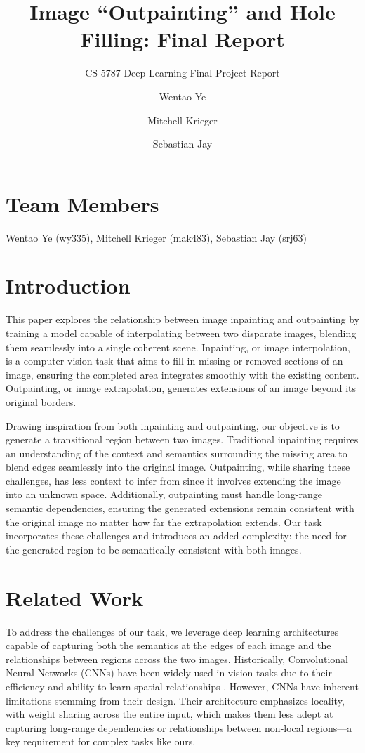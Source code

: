 \documentclass[sigconf]{acmart}
\title{Image “Outpainting” and Hole Filling: Final Report}
\subtitle{CS 5787 Deep Learning Final Project Report}
\author{Wentao Ye}
\affiliation{%
  \institution{Cornell University}
  \city{New York}
  \state{New York}
  \country{USA}
}
\author{Mitchell Krieger}
\affiliation{%
  \institution{Cornell University}
  \city{New York}
  \state{New York}
  \country{USA}
}
\author{Sebastian Jay}
\affiliation{%
  \institution{Cornell University}
  \city{New York}
  \state{New York}
  \country{USA}
}
\begin{document}
\maketitle

\section*{Team Members}
Wentao Ye (wy335), Mitchell Krieger (mak483), Sebastian Jay (srj63)

\section*{Introduction}
This paper explores the relationship between image inpainting and outpainting by training a model capable of interpolating between two disparate images, blending them seamlessly into a single coherent scene. Inpainting, or image interpolation, is a computer vision task that aims to fill in missing or removed sections of an image, ensuring the completed area integrates smoothly with the existing content. Outpainting, or image extrapolation, generates extensions of an image beyond its original borders.

Drawing inspiration from both inpainting and outpainting, our objective is to generate a transitional region between two images. Traditional inpainting requires an understanding of the context and semantics surrounding the missing area to blend edges seamlessly into the original image. Outpainting, while sharing these challenges, has less context to infer from since it involves extending the image into an unknown space. Additionally, outpainting must handle long-range semantic dependencies, ensuring the generated extensions remain consistent with the original image no matter how far the extrapolation extends. Our task incorporates these challenges and introduces an added complexity: the need for the generated region to be semantically consistent with both images.

\section*{Related Work}
To address the challenges of our task, we leverage deep learning architectures capable of capturing both the semantics at the edges of each image and the relationships between regions across the two images. Historically, Convolutional Neural Networks (CNNs) have been widely used in vision tasks due to their efficiency and ability to learn spatial relationships \cite{LeCun1998, Krizhevsky2012}. However, CNNs have inherent limitations stemming from their design. Their architecture emphasizes locality, with weight sharing across the entire input, which makes them less adept at capturing long-range dependencies or relationships between non-local regions—a key requirement for complex tasks like ours.
\end{document}
